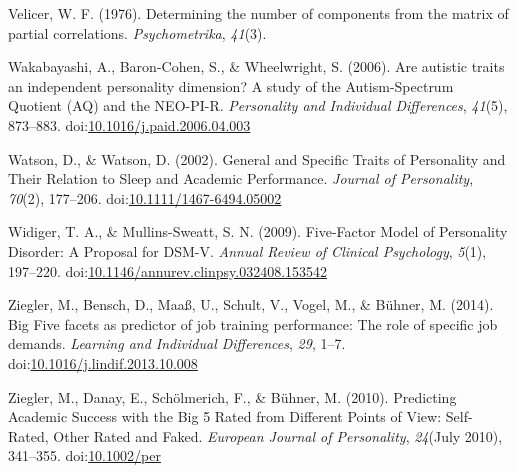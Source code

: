 \documentclass[,man,floatsintext]{apa6}
\begin{document}
\hypertarget{ref-Velicer1976}{}
Velicer, W. F. (1976). Determining the number of components from the
matrix of partial correlations. \emph{Psychometrika}, \emph{41}(3).

\hypertarget{ref-Wakabayashi2006}{}
Wakabayashi, A., Baron-Cohen, S., \& Wheelwright, S. (2006). Are
autistic traits an independent personality dimension? A study of the
Autism-Spectrum Quotient (AQ) and the NEO-PI-R. \emph{Personality and
Individual Differences}, \emph{41}(5), 873--883.
doi:\href{https://doi.org/10.1016/j.paid.2006.04.003}{10.1016/j.paid.2006.04.003}

\hypertarget{ref-Watson2002}{}
Watson, D., \& Watson, D. (2002). General and Specific Traits of
Personality and Their Relation to Sleep and Academic Performance.
\emph{Journal of Personality}, \emph{70}(2), 177--206.
doi:\href{https://doi.org/10.1111/1467-6494.05002}{10.1111/1467-6494.05002}

\hypertarget{ref-WidigerMullins2009}{}
Widiger, T. A., \& Mullins-Sweatt, S. N. (2009). Five-Factor Model of
Personality Disorder: A Proposal for DSM-V. \emph{Annual Review of
Clinical Psychology}, \emph{5}(1), 197--220.
doi:\href{https://doi.org/10.1146/annurev.clinpsy.032408.153542}{10.1146/annurev.clinpsy.032408.153542}

\hypertarget{ref-Ziegler2014}{}
Ziegler, M., Bensch, D., Maaß, U., Schult, V., Vogel, M., \& Bühner, M.
(2014). Big Five facets as predictor of job training performance: The
role of specific job demands. \emph{Learning and Individual
Differences}, \emph{29}, 1--7.
doi:\href{https://doi.org/10.1016/j.lindif.2013.10.008}{10.1016/j.lindif.2013.10.008}

\hypertarget{ref-Ziegler2010}{}
Ziegler, M., Danay, E., Schölmerich, F., \& Bühner, M. (2010).
Predicting Academic Success with the Big 5 Rated from Different Points
of View: Self-Rated, Other Rated and Faked. \emph{European Journal of
Personality}, \emph{24}(July 2010), 341--355.
doi:\href{https://doi.org/10.1002/per}{10.1002/per}

\endgroup

\clearpage

\renewcommand{\listtablename}{Table captions}

\listoftables
\end{document}
